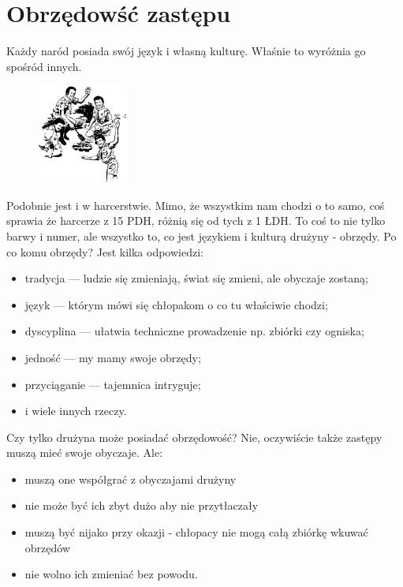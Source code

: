 \section{Obrzędowść zastępu}
Każdy naród posiada swój język i własną kulturę. Właśnie to wyróżnia go spośród innych. \begin{figure}
  \begin{center}
    \includegraphics[width=3cm]{grafiki/happy.png}
  \end{center}
\end{figure} Podobnie jest i w  harcerstwie. Mimo, że wszystkim nam  chodzi o to samo, coś sprawia że harcerze z 15 PDH, różnią się od tych z 1 ŁDH. To  coś  to  nie  tylko  barwy i numer, ale wszystko to, co jest językiem i kulturą drużyny - obrzędy.
	Po co komu obrzędy? Jest  kilka  odpowiedzi:
\begin{itemize}[noitemsep,nolistsep] 
\item  tradycja --- ludzie się zmieniają,  świat się zmieni,  ale obyczaje zostaną;
\item  język --- którym mówi się chłopakom o co tu  właściwie chodzi;
\item  dyscyplina --- ułatwia techniczne prowadzenie np. zbiórki czy ogniska;
\item  jedność --- my mamy swoje obrzędy;
\item  przyciąganie ---  tajemnica intryguje;
\item  i wiele innych rzeczy.
\end{itemize}
	Czy tylko drużyna może posiadać obrzędowość? Nie, oczywiście także zastępy muszą mieć swoje obyczaje. Ale:
	\begin{itemize}[noitemsep,nolistsep] 
\item  muszą one współgrać z obyczajami drużyny
\item  nie może być  ich zbyt  dużo  aby  nie  przytłaczały
\item  muszą być nijako przy  okazji - chłopacy nie mogą całą zbiórkę wkuwać obrzędów
\item  nie wolno ich zmieniać bez powodu.
\end{itemize}
